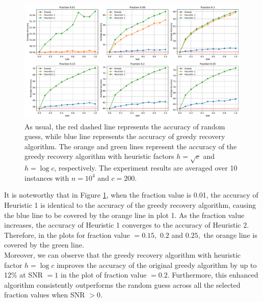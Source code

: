 \begin{figure}[H]
    \centering
    \includegraphics[width=1\linewidth]{Figures/heu_super_dense.pdf}
    \caption[Accuracy of Greedy Recovery Algorithm versus Heuristic Strategy with 2 Different Factors for $k=2$.]{As usual, the red dashed line represents the accuracy of random guess, while blue line represents the accuracy of greedy recovery algorithm. The orange and green lines represent the accuracy of the greedy recovery algorithm with heuristic factors $h=\sqrt{c}$ and $h=\log{c}$, respectively. The experiment results are averaged over 10 instances with $n=10^4$ and $c=200.$}
    \label{fig: heuristic greedy}
\end{figure}
It is noteworthy that in Figure \ref{fig: heuristic greedy}, when the fraction value is 0.01, the accuracy of Heuristic 1 is identical to the accuracy of the greedy recovery algorithm, causing the blue line to be covered by the orange line in plot 1. As the fraction value increases, the accuracy of Heuristic 1 converges to the accuracy of Heuristic 2.  Therefore, in the plots for fraction value $=0.15,$ $0.2$ and $0.25,$ the orange line is covered by the green line.\\
Moreover, we can observe that the greedy recovery algorithm with heuristic factor $h=\log{c}$ improves the accuracy of the original greedy algorithm by up to 12\% at SNR $=1$ in the plot of fraction value $=0.2.$ Furthermore, this enhanced algorithm consistently outperforms the random guess across all the selected fraction values when SNR $>0$.


